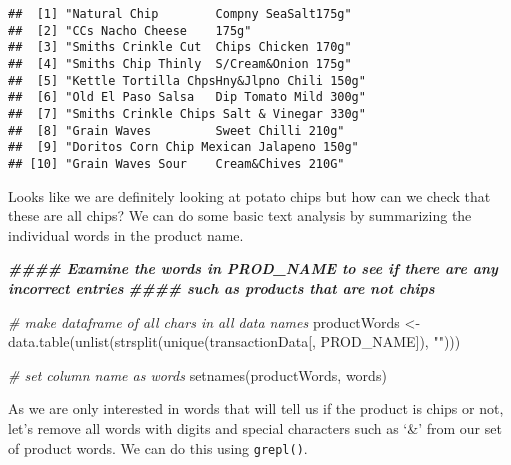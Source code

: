 \documentclass[
]{article}
\newenvironment{Shaded}{\begin{snugshade}}{\end{snugshade}}
\newcommand{\CommentTok}[1]{\textcolor[rgb]{0.56,0.35,0.01}{\textit{#1}}}
\newcommand{\DecValTok}[1]{\textcolor[rgb]{0.00,0.00,0.81}{#1}}
\newcommand{\DocumentationTok}[1]{\textcolor[rgb]{0.56,0.35,0.01}{\textbf{\textit{#1}}}}
\newcommand{\FunctionTok}[1]{\textcolor[rgb]{0.00,0.00,0.00}{#1}}
\newcommand{\NormalTok}[1]{#1}
\newcommand{\OtherTok}[1]{\textcolor[rgb]{0.56,0.35,0.01}{#1}}
\newcommand{\SpecialCharTok}[1]{\textcolor[rgb]{0.00,0.00,0.00}{#1}}
\newcommand{\StringTok}[1]{\textcolor[rgb]{0.31,0.60,0.02}{#1}}
\begin{document}
\begin{Shaded}
\end{Shaded}

\begin{verbatim}
##  [1] "Natural Chip        Compny SeaSalt175g"  
##  [2] "CCs Nacho Cheese    175g"                
##  [3] "Smiths Crinkle Cut  Chips Chicken 170g"  
##  [4] "Smiths Chip Thinly  S/Cream&Onion 175g"  
##  [5] "Kettle Tortilla ChpsHny&Jlpno Chili 150g"
##  [6] "Old El Paso Salsa   Dip Tomato Mild 300g"
##  [7] "Smiths Crinkle Chips Salt & Vinegar 330g"
##  [8] "Grain Waves         Sweet Chilli 210g"   
##  [9] "Doritos Corn Chip Mexican Jalapeno 150g" 
## [10] "Grain Waves Sour    Cream&Chives 210G"
\end{verbatim}

Looks like we are definitely looking at potato chips but how can we
check that these are all chips? We can do some basic text analysis by
summarizing the individual words in the product name.

\begin{Shaded}
\begin{Highlighting}[]
\DocumentationTok{\#\#\#\# Examine the words in PROD\_NAME to see if there are any incorrect entries}
\DocumentationTok{\#\#\#\# such as products that are not chips}

\CommentTok{\# make dataframe of all chars in all data names}
\NormalTok{productWords }\OtherTok{\textless{}{-}} \FunctionTok{data.table}\NormalTok{(}\FunctionTok{unlist}\NormalTok{(}\FunctionTok{strsplit}\NormalTok{(}\FunctionTok{unique}\NormalTok{(transactionData[, PROD\_NAME]), }\StringTok{""}\NormalTok{)))}

\CommentTok{\# set column name as words}
\FunctionTok{setnames}\NormalTok{(productWords, }\StringTok{\textquotesingle{}words\textquotesingle{}}\NormalTok{)}
\end{Highlighting}
\end{Shaded}

As we are only interested in words that will tell us if the product is
chips or not, let's remove all words with digits and special characters
such as `\&' from our set of product words. We can do this using
\texttt{grepl()}.
\end{document}
